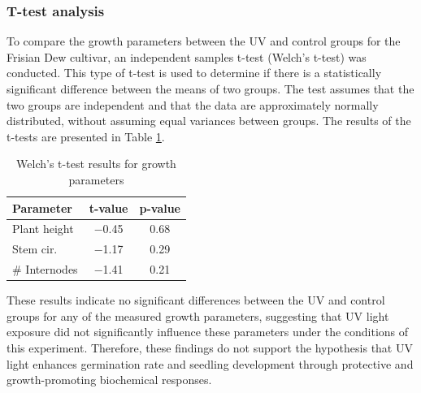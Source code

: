\subsubsection{T-test analysis}

To compare the growth parameters between the UV and control groups for the Frisian Dew cultivar, an independent samples t-test (Welch's t-test) was conducted. This type of t-test is used to determine if there is a statistically significant difference between the means of two groups. The test assumes that the two groups are independent and that the data are approximately normally distributed, without assuming equal variances between groups. The results of the t-tests are presented in Table \ref{tab:t-test_results}.

\begin{table}[H]
    \caption{Welch's t-test results for growth parameters}
    \label{tab:t-test_results}
    \begin{tabularx}{\linewidth}{lcc}
        \toprule
        \textbf{Parameter} & \textbf{t-value} & \textbf{p-value} \\
        \midrule
        Plant height & \num[mode=text]{-0.45} & \num[mode=text]{0.68} \\
        Stem cir. & \num[mode=text]{-1.17} & \num[mode=text]{0.29} \\
        \# Internodes & \num[mode=text]{-1.41} & \num[mode=text]{0.21} \\
        \bottomrule
    \end{tabularx}
\end{table}

These results indicate no significant differences between the UV and control groups for any of the measured growth parameters, suggesting that UV light exposure did not significantly influence these parameters under the conditions of this experiment. Therefore, these findings do not support the hypothesis that UV light enhances germination rate and seedling development through protective and growth-promoting biochemical responses.